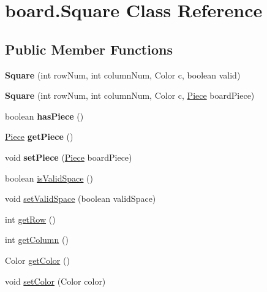 \hypertarget{classboard_1_1_square}{\section{board.\-Square Class Reference}
\label{classboard_1_1_square}
}
\subsection*{Public Member Functions}
\begin{DoxyCompactItemize}
\item 
\hypertarget{classboard_1_1_square_a6a23d51e6488455deca3777169fd40a4}{{\bfseries Square} (int row\-Num, int column\-Num, Color c, boolean valid)}\label{classboard_1_1_square_a6a23d51e6488455deca3777169fd40a4}

\item 
\hypertarget{classboard_1_1_square_aa174e0f9b97da735ff6a152887eab0f8}{{\bfseries Square} (int row\-Num, int column\-Num, Color c, \hyperlink{classpieces_1_1_piece}{Piece} board\-Piece)}\label{classboard_1_1_square_aa174e0f9b97da735ff6a152887eab0f8}

\item 
\hypertarget{classboard_1_1_square_ad4ad301ca32b84efe682387a9d9a319d}{boolean {\bfseries has\-Piece} ()}\label{classboard_1_1_square_ad4ad301ca32b84efe682387a9d9a319d}

\item 
\hypertarget{classboard_1_1_square_adc34c9562b336ed5c72c149fb1c9d699}{\hyperlink{classpieces_1_1_piece}{Piece} {\bfseries get\-Piece} ()}\label{classboard_1_1_square_adc34c9562b336ed5c72c149fb1c9d699}

\item 
\hypertarget{classboard_1_1_square_a0941391ade5f582b9bd70656332d6c6c}{void {\bfseries set\-Piece} (\hyperlink{classpieces_1_1_piece}{Piece} board\-Piece)}\label{classboard_1_1_square_a0941391ade5f582b9bd70656332d6c6c}

\item 
boolean \hyperlink{classboard_1_1_square_ac4361e31669bf7fb09c9d7f2945c80c0}{is\-Valid\-Space} ()
\item 
void \hyperlink{classboard_1_1_square_aaf2bb85bbd8bd7662833c477bd34a6b2}{set\-Valid\-Space} (boolean valid\-Space)
\item 
int \hyperlink{classboard_1_1_square_a6494b2e4d6e3f8c58cdbc831ce3bd161}{get\-Row} ()
\item 
int \hyperlink{classboard_1_1_square_a5b8f33f9a2e9128a734e491697059c3f}{get\-Column} ()
\item 
Color \hyperlink{classboard_1_1_square_a5e25028bc63643ff36f5b259b74adba4}{get\-Color} ()
\item 
void \hyperlink{classboard_1_1_square_a6adc448bc6c734eee3076d3b87d57930}{set\-Color} (Color color)
\end{DoxyCompactItemize}



